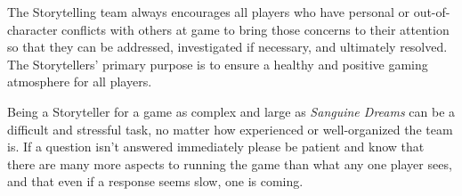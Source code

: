The Storytelling team always encourages all players who have personal or out-of-character conflicts 
with others at game to bring those concerns to their attention so that they can be addressed, 
investigated if necessary, and ultimately resolved.  The Storytellers' primary purpose is to ensure 
a healthy and positive gaming atmosphere for all players.

Being a Storyteller for a game as complex and large as \emph{Sanguine Dreams} can be a difficult 
and stressful task, no matter how experienced or well-organized the team is.  If a question isn't 
answered immediately please be patient and know that there are many more aspects to running the game 
than what any one player sees, and that even if a response seems slow, one is coming.
